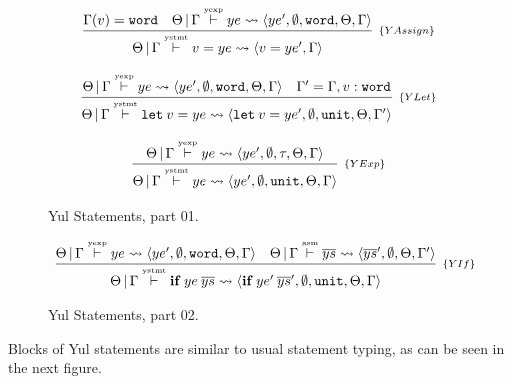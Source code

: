 \documentclass[a4paper, 11pt]{article}
\theoremstyle{definition}
\begin{document}
\begin{figure}[H]
  \[
    \begin{array}{c}
      \infer[_{\{YAssign\}}]
            {\Theta\,|\,\Gamma \typing{ystmt} v = ye \leadsto \langle v = ye', \Gamma \rangle}
            {\Gamma(v) = \word &
             \Theta\,|\,\Gamma \typing{yexp} ye \leadsto \langle ye', \emptyset, \word, \Theta, \Gamma \rangle}
      \\ \\
      \infer[_{\{YLet\}}]
            {\Theta\,|\,\Gamma\typing{ystmt}\mathtt{let}\: v = ye
              \leadsto \langle \mathtt{let}\: v = ye'
                       , \emptyset, \unit, \Theta, \Gamma'\rangle}
              {\Theta\,|\,\Gamma \typing{yexp} ye \leadsto \langle ye', \emptyset, \word, \Theta, \Gamma\rangle &
               \Gamma' = \Gamma, v : \word}
      \\ \\
      \infer[_{\{YExp\}}]
            {\Theta\,|\,\Gamma \typing{ystmt} ye \leadsto \langle ye', \emptyset, \unit, \Theta,\Gamma \rangle}
            {\Theta\,|\,\Gamma \typing{yexp} ye \leadsto \langle ye', \emptyset, \tau, \Theta, \Gamma\rangle }
    \end{array}
  \]
  \centering
  \caption{Yul Statements, part 01.}
  \label{fig:typingyul01}
\end{figure}

\begin{figure}[H]
  \[
    \begin{array}{c}
      \infer[_{\{YIf\}}]
            {\Theta\,|\,\Gamma \typing {ystmt} \mathbf{if}\:ye\:\overline{ys} \leadsto \langle \mathbf{if}\:ye'\:\overline{ys}', \emptyset, \unit, \Theta, \Gamma\rangle}
            {\Theta\,|\,\Gamma \typing{yexp} ye \leadsto \langle ye', \emptyset, \word, \Theta, \Gamma\rangle &
             \Theta\,|\,\Gamma \typing{asm}\overline{ys} \leadsto\langle \overline{ys}', \emptyset, \Theta, \Gamma'\rangle}
    \end{array}
  \]
  \centering
  \caption{Yul Statements, part 02.}
  \label{fig:typingyul02}
\end{figure}

Blocks of Yul statements are similar to usual statement typing,
as can be seen in the next figure.
\end{document}
